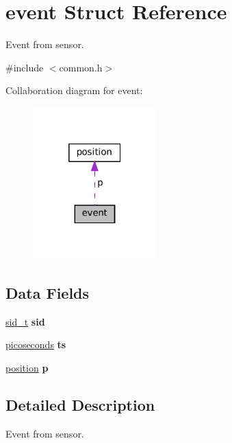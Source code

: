 \hypertarget{structevent}{}\section{event Struct Reference}
\label{structevent}


Event from sensor.  




{\ttfamily \#include $<$common.\+h$>$}



Collaboration diagram for event\+:\nopagebreak
\begin{figure}[H]
\begin{center}
\leavevmode
\includegraphics[width=136pt]{structevent__coll__graph}
\end{center}
\end{figure}
\subsection*{Data Fields}
\begin{DoxyCompactItemize}
\item 
\mbox{\label{structevent_ad9b81c84e4a779b2a38b81e3918a9889}} 
\mbox{\hyperlink{common_8h_af10e2dceeefdc0af7b5bab152a6380d2}{sid\+\_\+t}} {\bfseries sid}
\item 
\mbox{\label{structevent_a88196c1fb2eb2b3764ff9d59926597b4}} 
\mbox{\hyperlink{common_8h_aa141e5aeed9e5c126c44e1e0ca46a917}{picoseconds}} {\bfseries ts}
\item 
\mbox{\label{structevent_a91726a3d7415e5d3933c1f900dfb56f4}} 
\mbox{\hyperlink{structposition}{position}} {\bfseries p}
\end{DoxyCompactItemize}


\subsection{Detailed Description}
Event from sensor. 

